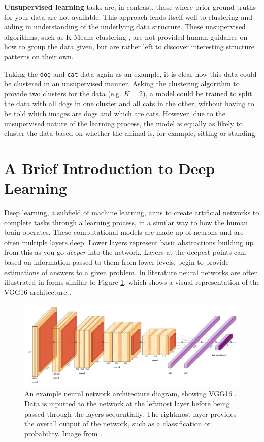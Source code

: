 \textbf{Unsupervised learning} tasks are, in contrast, those where prior ground truths for your data are not available. This approach lends itself well to clustering and aiding in understanding of the underlying data structure. These unsupervised algorithms, such as K-Means clustering \cite{hartigan_algorithm_1979}, are not provided human guidance on how to group the data given, but are rather left to discover interesting structure patterns on their own. 

Taking the \texttt{dog} and \texttt{cat} data again as an example, it is clear how this data could be clustered in an unsupervised manner. Asking the clustering algorithm to provide two clusters for the data  (e.g. $K = 2$), a model could be trained to split the data with all dogs in one cluster and all cats in the other, without having to be told which images are dogs and which are cats. However, due to the unsupervised nature of the learning process, the model is equally as likely to cluster the data based on whether the animal is, for example, sitting or standing. 

\section{A Brief Introduction to Deep Learning}\label{ch:Background,sec:DLIntro}

Deep learning, a subfield of machine learning, aims to create artificial networks to complete tasks through a learning process, in a similar way to how the human brain operates. These computational models are made up of neurons and are often multiple layers deep. Lower layers represent basic abstractions building up from this as you go \textit{deeper} into the network. Layers at the deepest points can, based on information passed to them from lower levels, begin to provide estimations of answers to a given problem. In literature neural networks are often illustrated in forms similar to Figure \ref{fig:NN-example}, which shows a visual representation of the VGG16 architecture \cite{simonyan_very_2015}. 

\begin{figure}
	\begin{center}
		\includegraphics[scale=0.2]{Chapter2/figs/example-model.png}
	\end{center}
	\caption{An example neural network architecture diagram, showing VGG16 \cite{simonyan_very_2015}. Data is inputted to the network at the leftmost layer before being passed through the layers sequentially. The rightmost layer provides the overall output of the network, such as a classification or probability. Image from \cite{harislqbal88_plotneuralnet_2018}.}
	\label{fig:NN-example}
\end{figure}

